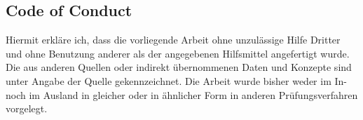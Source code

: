 \documentclass[12pt,a4paper,parskip=full,abstract=true,BCOR=12mm,twoside,open=right]{scrreprt}
\begin{document}
\begin{otherlanguage}{ngerman}
    \chapter*{Code of Conduct}
    Hiermit erkl\"are ich, dass die vorliegende Arbeit ohne unzul\"assige Hilfe Dritter und ohne Benutzung
    anderer als der angegebenen Hilfsmittel angefertigt wurde. Die aus anderen Quellen oder indirekt
    \"ubernommenen Daten und Konzepte sind unter Angabe der Quelle gekennzeichnet.
    Die Arbeit wurde bisher weder im In- noch im Ausland in gleicher oder in \"ahnlicher Form in anderen
    Pr\"ufungsverfahren vorgelegt.

    \par\noindent\makebox[7cm]{\hrulefill}      \hfill\makebox[5cm]{\hrulefill}%
    \par\noindent{} \hfill{}%
\end{otherlanguage}
\end{document}
